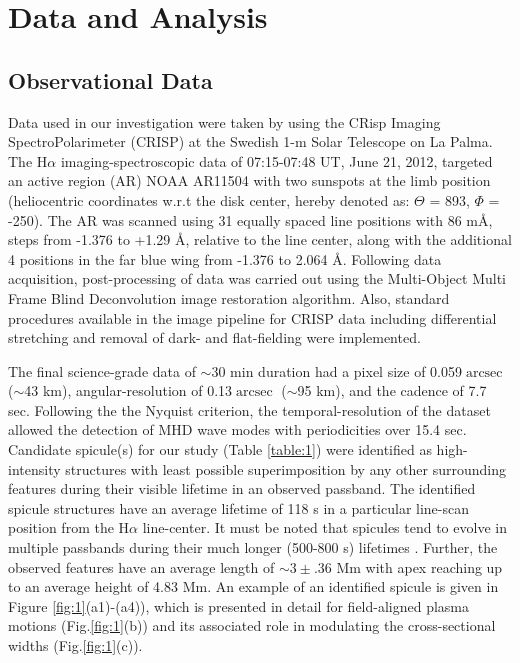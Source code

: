 \documentclass[12pt]{ociamthesis}
\DeclareMathOperator{\arcsec}{arcsec}
\begin{document}
\section{Data and Analysis}

\subsection{Observational Data}

Data used in our investigation were taken by using the CRisp Imaging SpectroPolarimeter (CRISP) at the Swedish 1-m Solar Telescope \citep[SST:][]{Scharmer2008} on La Palma. The H$\alpha$ imaging-spectroscopic data of 07:15-07:48 UT, June 21, 2012, targeted an active region (AR) NOAA AR11504 with two sunspots at the limb position (heliocentric coordinates w.r.t the disk center, hereby denoted as: $\Theta$ = 893, $\Phi$ = -250). The AR was scanned using 31 equally spaced line positions with 86 m\AA, steps from -1.376 to +1.29 \AA, relative to the line center, along with the additional 4 positions in the far blue wing from -1.376 to 2.064 \AA. Following data acquisition, post-processing of data was carried out using the Multi-Object Multi Frame Blind Deconvolution \citep [MOMFBD;][]{2005} image restoration algorithm. Also, standard procedures available in the image pipeline for CRISP data \citep{2015} including differential stretching and removal of dark- and flat-fielding were implemented. 

The final science-grade data of $\sim$30 min duration had a pixel size of 0.059$\arcsec$ ($\sim$43 km), angular-resolution of 0.13$\arcsec$ ($\sim$95 km), and the cadence of 7.7 sec. Following the the Nyquist criterion, the temporal-resolution of the dataset allowed the detection of MHD wave modes with periodicities over 15.4 sec. Candidate spicule(s) for our study (Table \ref{table:1}) were identified as high-intensity structures with least possible superimposition by any other surrounding features during their visible lifetime in an observed passband. The identified spicule structures have an average lifetime of 118 s in a particular line-scan position from the H$\alpha$ line-center. It must be noted that spicules tend to evolve in multiple passbands during their much longer (500-800 s) lifetimes \citep{Pereira2014}. Further, the observed features have an average length of $\sim3\pm$.36 Mm with apex reaching up to an average height of 4.83 Mm. An example of an identified spicule is given in Figure \ref{fig:1}(a1)-(a4)), which is presented in detail for field-aligned plasma motions (Fig.\ref{fig:1}(b)) and its associated role in modulating the cross-sectional widths (Fig.\ref{fig:1}(c)). \\
\end{document}

